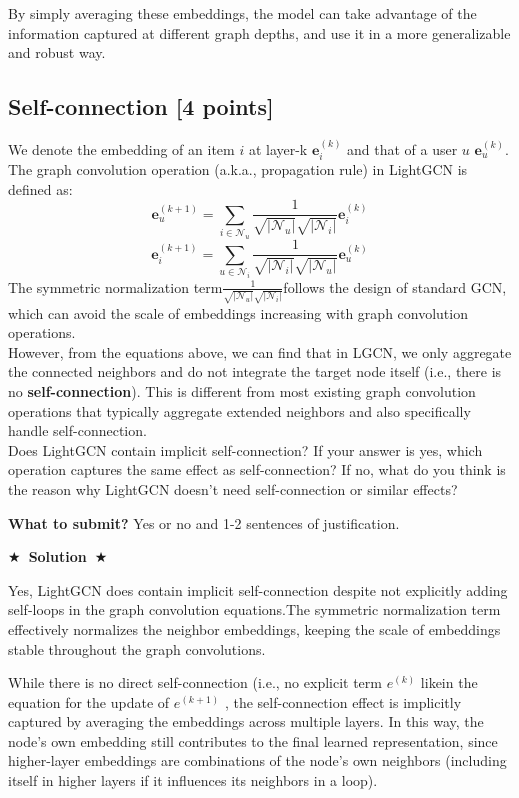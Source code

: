 \documentclass[11pt]{article}
\newcommand{\Solution}[1]{{\medskip \color{red} \bf $\bigstar$~\sf \textbf{Solution}~$\bigstar$ \sf #1 } \bigskip}
\begin{document}
By simply averaging these embeddings, the model can take advantage of the information captured at different graph depths, and use it in a more generalizable and robust way.


\subsection{Self-connection [4 points]}
We denote the embedding of an item $i$ at layer-k $\mathbf{e}_i^{(k)}$ and that of a user $u$ $\mathbf{e}_u^{(k)}$. The graph convolution operation (a.k.a., propagation rule) in LightGCN is defined as:
$$\mathbf{e}^{(k+1)}_u = \sum_{i\in\mathcal{N}_u}\frac{1}{\sqrt{\lvert\mathcal{N}_u\rvert}\sqrt{\lvert\mathcal{N}_i\rvert}}\mathbf{e}^{(k)}_i$$
$$\mathbf{e}^{(k+1)}_i = \sum_{u\in\mathcal{N}_i}\frac{1}{\sqrt{\lvert\mathcal{N}_i\rvert}\sqrt{\lvert\mathcal{N}_u\rvert}}\mathbf{e}^{(k)}_u$$  
The symmetric normalization term$\frac{1}{\sqrt{\lvert\mathcal{N}_u\rvert}\sqrt{\lvert\mathcal{N}_i\rvert}}$follows the design of standard GCN, which can avoid the scale of embeddings increasing with graph convolution operations.\\ 

\noindent However, from the equations above, we can find that in LGCN, we only aggregate the connected neighbors and do not integrate the target node itself (i.e., there is no \textbf{self-connection}). This is different from most existing graph convolution operations that typically aggregate extended neighbors and also specifically handle self-connection.\\

\noindent Does LightGCN contain implicit self-connection? If your answer is yes, which operation captures the same effect as self-connection? If no, what do you think is the reason why LightGCN doesn't need self-connection or similar effects?

\textbf{What to submit?} Yes or no and 1-2 sentences of justification.

\Solution{}

Yes, LightGCN does contain implicit self-connection despite not explicitly adding self-loops in the graph convolution equations.The symmetric normalization term effectively normalizes the neighbor embeddings, keeping the scale of embeddings stable throughout the graph convolutions.

While there is no direct self-connection (i.e., no explicit term ${e}^{(k)}$ likein the equation for the update of ${e}^{(k+1)}$ , the self-connection effect is implicitly captured by averaging the embeddings across multiple layers. In this way, the node's own embedding still contributes to the final learned representation, since higher-layer embeddings are combinations of the node's own neighbors (including itself in higher layers if it influences its neighbors in a loop).
\end{document}
